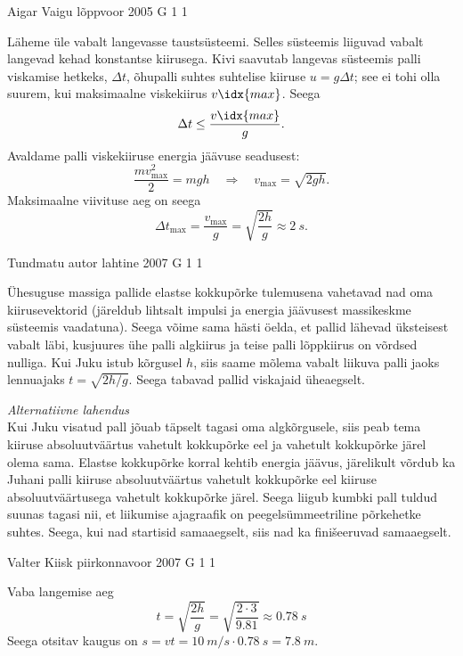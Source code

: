 \documentclass[11pt, twoside]{article}
\begin{document}
{%
{Aigar Vaigu} %
{lõppvoor} %
{2005} %
{G 1} %
{1} %
{

\ifSolution
Läheme üle vabalt langevasse taustsüsteemi. Selles süsteemis liiguvad vabalt langevad kehad konstantse kiirusega. Kivi saavutab langevas süsteemis palli viskamise hetkeks, $\Delta t$, õhupalli suhtes suhtelise kiiruse $u = g\Delta t$; see ei tohi olla suurem, kui maksimaalne viskekiirus $v\idx{max}$. Seega
\[
\Delta t \leq \frac{v\idx{max}}{g}.
\]
Avaldame palli viskekiiruse energia jäävuse seadusest:
\[
\frac{m v_{\max }^{2}}{2}=m g h \quad \Rightarrow \quad v_{\max }=\sqrt{2 g h}.
\]
Maksimaalne viivituse aeg on seega
\[
\Delta t_{\max }=\frac{v_{\max }}{g}=\sqrt{\frac{2 h}{g}} \approx \SI{2}{s}.
\]
\fi
}

{Tundmatu autor} %
{lahtine} %
{2007} %
{G 1} %
{1} %
{

\ifSolution
Ühesuguse massiga pallide elastse kokkupõrke tulemusena vahetavad nad oma
kiirusevektorid (järeldub lihtsalt impulsi ja energia jäävusest massikeskme süsteemis vaadatuna). Seega võime sama hästi öelda, et pallid lähevad üksteisest vabalt läbi, kusjuures ühe palli algkiirus ja teise palli lõppkiirus on võrdsed nulliga. Kui Juku istub kõrgusel $h$, siis saame mõlema vabalt liikuva palli jaoks lennuajaks $t = \sqrt{2h/g}$. Seega tabavad pallid viskajaid üheaegselt. 

\vspace{0.5\baselineskip}

\emph{Alternatiivne lahendus}\\
Kui Juku visatud pall jõuab täpselt tagasi oma algkõrgusele, siis peab tema kiiruse absoluutväärtus vahetult kokkupõrke eel ja vahetult kokkupõrke järel olema sama. Elastse kokkupõrke korral kehtib energia jäävus, järelikult võrdub ka Juhani palli kiiruse absoluutväärtus vahetult kokkupõrke eel kiiruse absoluutväärtusega vahetult kokkupõrke järel. Seega liigub kumbki pall tuldud suunas tagasi nii, et liikumise ajagraafik on peegelsümmeetriline põrkehetke suhtes. Seega, kui nad startisid samaaegselt, siis nad ka finišeeruvad samaaegselt.
\fi
}

{Valter Kiisk} %
{piirkonnavoor} %
{2007} %
{G 1} %
{1} %
{

\ifSolution
Vaba langemise aeg
\[
t=\sqrt{\frac{2 h}{g}}=\sqrt{\frac{2 \cdot 3}{\num{9,81}}} \approx \SI{0,78}{s}
\]
Seega otsitav kaugus on $s = vt = \SI{10}{m/s} \cdot \SI{0,78}{s} = \SI{7,8}{m}$.
\fi
}

}
\end{document}
